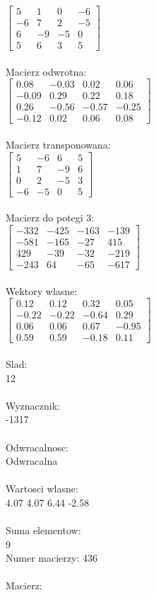 \documentclass[a4paper,12pt]{article}
\begin{document}
$\begin{bmatrix} 5&1&0&-6\\-6&7&2&-5\\6&-9&-5&0\\5&6&3&5 \end{bmatrix}$
\\
\\
Macierz odwrotna:\\

$\begin{bmatrix} 0.08&-0.03&0.02&0.06\\-0.09&0.29&0.22&0.18\\0.26&-0.56&-0.57&-0.25\\-0.12&0.02&0.06&0.08 \end{bmatrix}$
\\
\\
Macierz transponowana:\\

$\begin{bmatrix} 5&-6&6&5\\1&7&-9&6\\0&2&-5&3\\-6&-5&0&5 \end{bmatrix}$
\\
\\
Macierz do potegi 3:\\

$\begin{bmatrix} -332&-425&-163&-139\\-581&-165&-27&415\\429&-39&-32&-219\\-243&64&-65&-617 \end{bmatrix}$
\\
\\
Wektory wlasne:\\

$\begin{bmatrix} 0.12&0.12&0.32&0.05\\-0.22&-0.22&-0.64&0.29\\0.06&0.06&0.67&-0.95\\0.59&0.59&-0.18&0.11 \end{bmatrix}$
\\
\\
Slad:\\
12
\\
\\
Wyznacznik:\\
-1317
\\
\\
Odwracalnosc:\\
Odwracalna
\\
\\
Wartosci wlasne:\\
4.07 4.07 6.44 -2.58
\\
\\
Suma elementow:\\
9
\\
\newpage
Numer macierzy:
436
\\
\\
Macierz:\\
\end{document}
